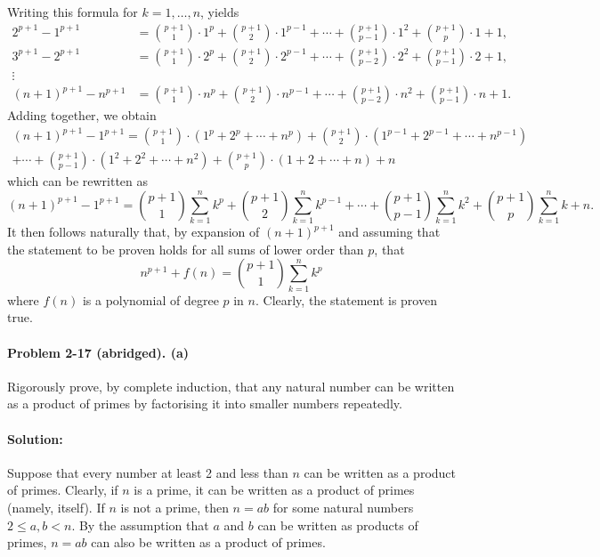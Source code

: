 \documentclass{article}
\begin{document}
Writing this formula for $k = 1, \ldots, n$, yields \begin{align*}
  2^{p+1} - 1^{p+1} &= \binom{p+1}{1} \cdot 1^p + \binom{p+1}{2} \cdot 1^{p-1}
  + \cdots + \binom{p+1}{p-1} \cdot 1^2 + \binom{p+1}{p} \cdot 1 + 1, \\
  3^{p+1} - 2^{p+1} &= \binom{p+1}{1} \cdot 2^p + \binom{p+1}{2} \cdot 2^{p-1}
  + \cdots + \binom{p+1}{p-2} \cdot 2^2 + \binom{p+1}{p-1} \cdot 2 + 1, \\
  \vdots & \\
  (n + 1)^{p+1} - n^{p+1} &= \binom{p+1}{1} \cdot n^p + \binom{p+1}{2} \cdot
  n^{p-1} + \cdots + \binom{p+1}{p-2} \cdot n^2 + \binom{p+1}{p-1} \cdot n + 1.
\end{align*}
Adding together, we obtain \begin{multline*}
  (n + 1)^{p+1} - 1^{p+1} = \binom{p+1}{1} \cdot (1^p + 2^p + \cdots + n^p) +
  \binom{p+1}{2} \cdot (1^{p-1} + 2^{p-1} + \cdots + n^{p-1}) \\ + \cdots +
  \binom{p+1}{p-1} \cdot (1^2 + 2^2 + \cdots + n^2) + \binom{p+1}{p} \cdot (1 +
  2 + \cdots + n) + n
\end{multline*} which can be rewritten as \begin{equation*}
  (n + 1)^{p+1} - 1^{p+1} = \binom{p+1}{1} \sum^n_{k=1} k^p + \binom{p+1}{2}
  \sum^n_{k=1} k^{p-1} + \cdots + \binom{p+1}{p-1} \sum^n_{k=1} k^2 +
  \binom{p+1}{p} \sum^n_{k=1} k + n.
\end{equation*}
It then follows naturally that, by expansion of $(n + 1)^{p+1}$ and assuming
that the statement to be proven holds for all sums of lower order than $p$,
that \begin{equation*}
  n^{p+1} + f(n) = \binom{p+1}{1} \sum^n_{k=1} k^p
\end{equation*} where $f(n)$ is a polynomial of degree $p$ in $n$. Clearly, the
statement is proven true.

\paragraph{Problem 2-17 (abridged). (a)} Rigorously prove, by complete
induction, that any natural number can be written as a product of primes by
factorising it into smaller numbers repeatedly.

\paragraph{Solution:} Suppose that every number at least 2 and less than $n$
can be written as a product of primes. Clearly, if $n$ is a prime, it can be
written as a product of primes (namely, itself). If $n$ is not a prime, then $n
= ab$ for some natural numbers $2 \leq a, b < n$. By the assumption that $a$
and $b$ can be written as products of primes, $n = ab$ can also be written as a
product of primes.
\end{document}
